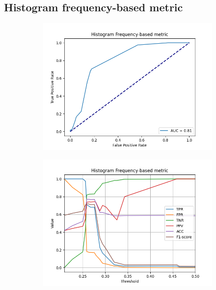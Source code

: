 \subsection{Histogram frequency-based metric}
\begin{figure}[H]
    \centering
    \begin{subfigure}[t]{0.48\textwidth}
        \includegraphics[width=\textwidth]{Figures/results_on_thresholds/output_roc_hf.png}
        \caption{}
        \label{fig:HF_roc}
    \end{subfigure}\hspace{1em}
    \begin{subfigure}[t]{0.48\textwidth}
        \includegraphics[width=\textwidth]{Figures/results_on_thresholds/threshold_test_scores_hf.png}

\end{subfigure}
\end{figure}
